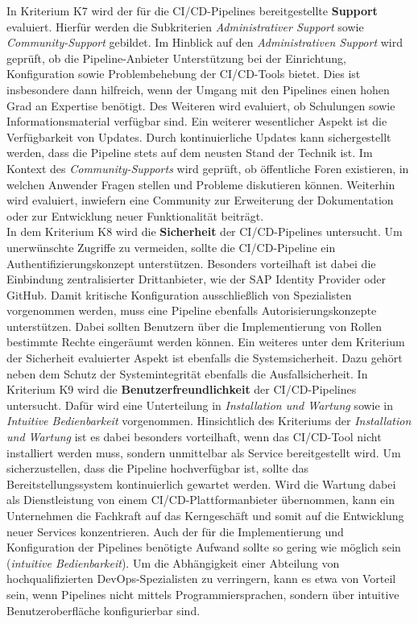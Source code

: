 In Kriterium K7 wird der für die CI/CD-Pipelines bereitgestellte \textbf{Support} evaluiert. Hierfür werden die Subkriterien \textit{Administrativer Support} sowie \textit{Community-Support} gebildet. Im Hinblick auf den \textit{Administrativen Support} wird geprüft, ob die Pipeline-Anbieter Unterstützung bei der Einrichtung, Konfiguration sowie Problembehebung der CI/CD-Tools bietet. Dies ist insbesondere dann hilfreich, wenn der Umgang mit den Pipelines einen hohen Grad an Expertise benötigt. Des Weiteren wird evaluiert, ob Schulungen sowie Informationsmaterial verfügbar sind. Ein weiterer wesentlicher Aspekt ist die Verfügbarkeit von Updates. Durch kontinuierliche Updates kann sichergestellt werden, dass die Pipeline stets auf dem neusten Stand der Technik ist. Im Kontext des \textit{Community-Supports} wird geprüft, ob öffentliche Foren existieren, in welchen Anwender Fragen stellen und Probleme diskutieren können. Weiterhin wird evaluiert, inwiefern eine Community zur Erweiterung der Dokumentation oder zur Entwicklung neuer Funktionalität beiträgt.\\
In dem Kriterium K8 wird die \textbf{Sicherheit} der CI/CD-Pipelines untersucht. Um unerwünschte Zugriffe zu vermeiden, sollte die CI/CD-Pipeline ein Authentifizierungskonzept unterstützen. Besonders vorteilhaft ist dabei die Einbindung zentralisierter Drittanbieter, wie der SAP Identity Provider oder GitHub. Damit kritische Konfiguration ausschließlich von Spezialisten vorgenommen werden, muss eine Pipeline ebenfalls Autorisierungskonzepte unterstützen. Dabei sollten Benutzern über die Implementierung von Rollen bestimmte Rechte eingeräumt werden können. Ein weiteres unter dem Kriterium der Sicherheit evaluierter Aspekt ist ebenfalls die Systemsicherheit. Dazu gehört neben dem Schutz der Systemintegrität ebenfalls die Ausfallsicherheit. 
In Kriterium K9 wird die \textbf{Benutzerfreundlichkeit} der CI/CD-Pipelines untersucht. Dafür wird eine Unterteilung in \textit{Installation und Wartung} sowie in \textit{Intuitive Bedienbarkeit} vorgenommen. Hinsichtlich des Kriteriums der \textit{Installation und Wartung} ist es dabei besonders vorteilhaft, wenn das CI/CD-Tool nicht installiert werden muss, sondern unmittelbar als Service bereitgestellt wird. Um sicherzustellen, dass die Pipeline hochverfügbar ist, sollte das Bereitstellungssystem kontinuierlich gewartet werden. Wird die Wartung dabei als Dienstleistung von einem CI/CD-Plattformanbieter übernommen, kann ein Unternehmen die Fachkraft auf das Kerngeschäft und somit auf die Entwicklung neuer Services konzentrieren. Auch der für die Implementierung und Konfiguration der Pipelines benötigte Aufwand sollte so gering wie möglich sein (\textit{intuitive Bedienbarkeit}). Um die Abhängigkeit einer Abteilung von hochqualifizierten DevOps-Spezialisten zu verringern, kann es etwa von Vorteil sein, wenn Pipelines nicht mittels Programmiersprachen, sondern über intuitive Benutzeroberfläche konfigurierbar sind. 
